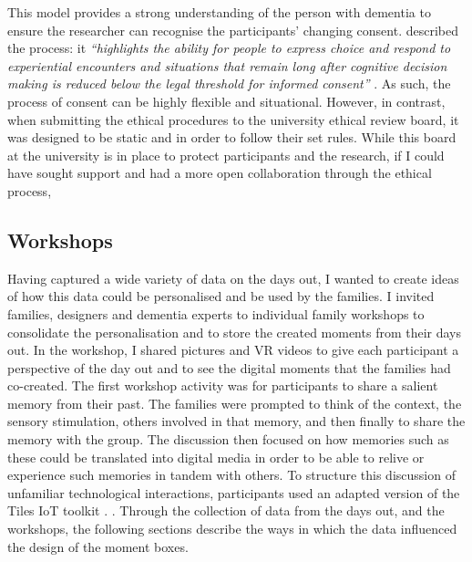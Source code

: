 This model provides a strong understanding of the person with dementia  to ensure the researcher can recognise the participants' changing consent. \cite{haraldsdottir2019relational} described the process: it \textit{``highlights the ability for people to express choice and respond to experiential encounters and situations that remain long after cognitive decision making is reduced below the legal threshold for informed consent''} \citep[p. 4]{haraldsdottir2019relational}. As such, the process of consent can be highly flexible and situational. However, in contrast, when submitting the ethical procedures to the university ethical review board, it was designed to be static and in order to follow their set rules. While this board at the university is in place to protect participants and the research, if I could have sought support and had a more open collaboration through the ethical process, 

\subsection{Workshops}
\label{workshops}
Having captured a wide variety of data on the days out, I wanted to create ideas of how this data could be personalised and be used by the families. I invited families, designers and dementia experts to individual family workshops to consolidate the personalisation and to store the created moments from their days out. In the workshop, I shared pictures and VR videos to give each participant a perspective of the day out and to see the digital moments that the families had co-created. The first workshop activity was for participants to share a salient memory from their past. The families were prompted to think of the context, the sensory stimulation, others involved in that memory, and then finally to share the memory with the group. The discussion then focused on how memories such as these could be translated into digital media in order to be able to relive or experience such memories in tandem with others. To structure this discussion of unfamiliar technological interactions, participants used an adapted version of the Tiles IoT toolkit \citep{mora2017tiles}. . Through the collection of data from the days out, and the workshops, the following sections describe the ways in which the data influenced the design of the moment boxes.

